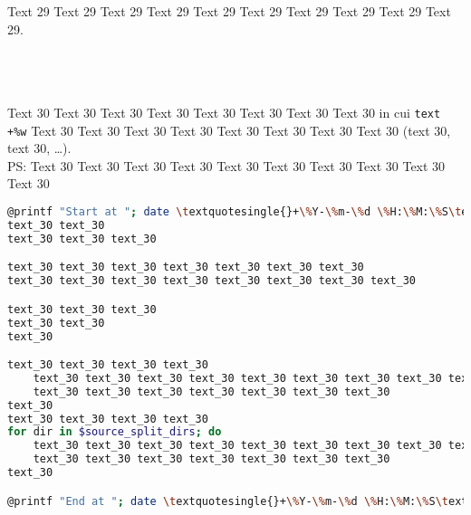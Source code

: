 \documentclass[9pt]{exam}
\begin{document}
\begin{questions}
\question
    Text 29 Text 29 Text 29 Text 29 Text 29 Text 29 Text 29 Text 29 
    Text 29 Text 29.\\\\
    \makebox[0.9\textwidth]{\$ \enspace\hrulefill}\\\\
    \makebox[0.9\textwidth]{\enspace\hrulefill}

\question
    Text 30 Text 30 Text 30 Text 30 Text 30 Text 30 Text 30 Text 30 
    in cui \textquotedbl{}\texttt{text \textquotesingle{}+\%w\textquotesingle{}}\textquotedbl{}
    Text 30 Text 30 Text 30 Text 30 Text 30 Text 30 Text 30 Text 30
    (text $30$, text $30$, \dots{}).\\
    PS: Text 30 Text 30 Text 30 Text 30 Text 30
        Text 30 Text 30 Text 30 Text 30 Text 30
\begin{lstlisting}[language=Bash, caption=Text 30 Text 30 Text 30 Text 30 Text 30]
@printf "Start at "; date \textquotesingle{}+\%Y-\%m-\%d \%H:\%M:\%S\textquotesingle{}@
text_30 text_30 
text_30 text_30 text_30

text_30 text_30 text_30 text_30 text_30 text_30 text_30
text_30 text_30 text_30 text_30 text_30 text_30 text_30 text_30

text_30 text_30 text_30
text_30 text_30
text_30

text_30 text_30 text_30 text_30
    text_30 text_30 text_30 text_30 text_30 text_30 text_30 text_30 text_30 text_30
    text_30 text_30 text_30 text_30 text_30 text_30 text_30
text_30
text_30 text_30 text_30 text_30
for dir in $source_split_dirs; do
    text_30 text_30 text_30 text_30 text_30 text_30 text_30 text_30 text_30 text_30
    text_30 text_30 text_30 text_30 text_30 text_30 text_30
text_30

@printf "End at "; date \textquotesingle{}+\%Y-\%m-\%d \%H:\%M:\%S\textquotesingle{}@
\end{lstlisting}
    \makebox[0.9\textwidth]{\$ \enspace\hrulefill}\\\\
    \makebox[0.9\textwidth]{\enspace\hrulefill}\\\\
    \makebox[0.9\textwidth]{\enspace\hrulefill}\\\\
    \makebox[0.9\textwidth]{\enspace\hrulefill}

\end{questions}
\end{document}

